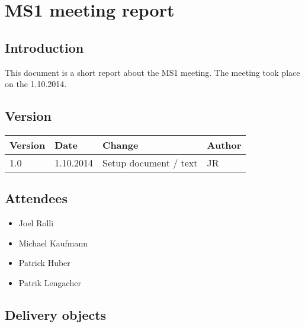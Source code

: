
\chapter{MS1 meeting report} %

\label{ChapterX} %



\section{Introduction}

This document is a short report about the MS1 meeting. The meeting took place on the 1.10.2014.

\section{Version}


\begin{tabular}{| p{1.5cm} | p{2cm} | p{9cm} | p{1.5cm} |}
    \hline
    Version & Date      & Change & Author \\ \hline
    1.0    & 1.10.2014        & Setup document / text                                        & JR \\ \hline
\end{tabular}


\section{Attendees}
\begin{itemize}
\item Joel Rolli
\item Michael Kaufmann
\item Patrick Huber
\item Patrik Lengacher
\end{itemize}

\section{Delivery objects}

